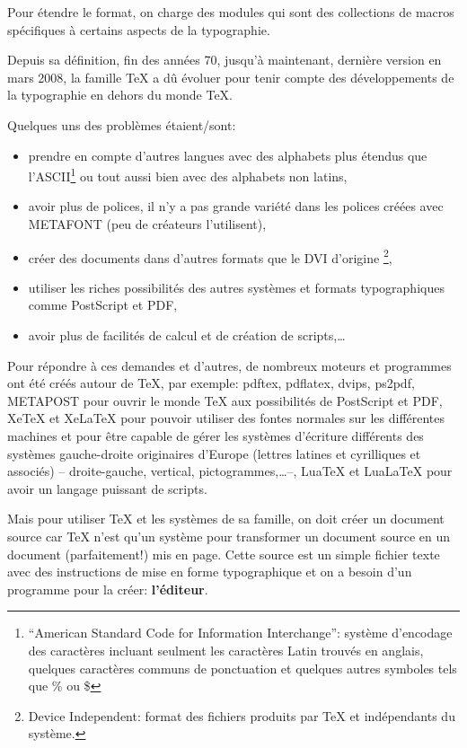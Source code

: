Pour étendre le format, on charge des \og modules\fg{} qui sont des collections de macros spécifiques à certains aspects de la typographie.

Depuis sa définition, fin des années 70, jusqu'à maintenant, dernière version en mars 2008, la famille \TeX{} a dû évoluer pour tenir compte des développements de la typographie en dehors du monde \TeX.

Quelques uns des problèmes étaient/sont:
\begin{itemize}
\item prendre en compte d'autres langues avec des \og alphabets\fg{} plus étendus que l'ASCII\footnote{``American Standard Code for Information Interchange'': système d'encodage des caractères incluant seulment les caractères Latin trouvés en anglais, quelques caractères communs de ponctuation et quelques autres symboles tels que \% ou \$} ou tout aussi bien avec des alphabets non latins, 
\item avoir plus de polices, il n'y a pas grande variété dans les polices créées avec \textsf{METAFONT} (peu de créateurs l'utilisent), 
\item créer des documents dans d'autres formats que le DVI d'origine \footnote{Device Independent: format des fichiers produits par \TeX{} et indépendants du système.}, 
\item utiliser les riches possibilités des autres systèmes et formats typographiques comme PostScript et PDF, 
\item avoir plus de facilités de calcul et de création de scripts,\dots
\end{itemize}

Pour répondre à ces demandes et d'autres, de nombreux \og moteurs\fg{} et programmes ont été créés autour de \TeX, par exemple: pdftex, pdflatex, dvips, ps2pdf, \textsf{METAPOST} pour ouvrir le monde \TeX{} aux possibilités de PostScript et PDF, XeTeX et XeLaTeX pour pouvoir utiliser des fontes \og normales\fg{} sur les différentes machines et pour être capable de gérer les systèmes d'écriture différents des systèmes gauche-droite originaires d'Europe (lettres latines et cyrilliques et associés) -- droite-gauche, vertical, pictogrammes,\dots --, LuaTeX et LuaLaTeX pour avoir un langage puissant de scripts.

Mais pour utiliser \TeX{} et les systèmes de sa famille, on doit créer un document \og source\fg{} car \TeX{} n'est qu'un système pour transformer un document source en un document (parfaitement!) mis en page. Cette source est un simple fichier texte avec des instructions de mise en forme typographique et on a besoin d'un programme pour la créer: \textbf{l'éditeur}.

